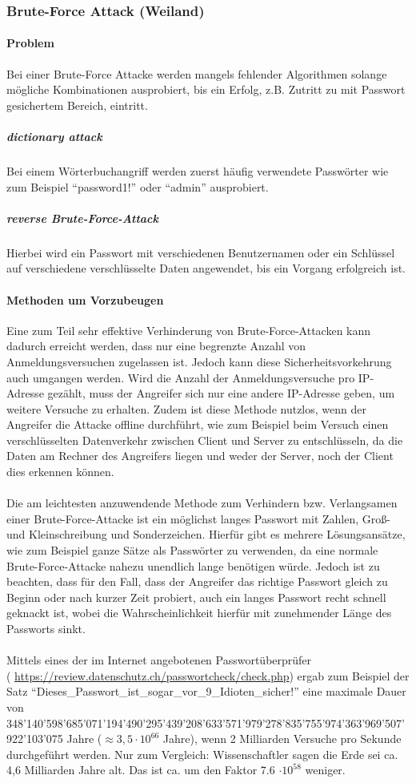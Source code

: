 \subsubsection{Brute-Force Attack (Weiland)}
\paragraph{Problem}
Bei einer Brute-Force Attacke werden mangels fehlender Algorithmen solange mögliche Kombinationen ausprobiert, bis ein Erfolg, z.B. Zutritt zu mit Passwort gesichertem Bereich, eintritt.
\subparagraph{dictionary attack}
Bei einem Wörterbuchangriff werden zuerst häufig verwendete Passwörter wie zum Beispiel \enquote{password1!} oder \enquote{admin} ausprobiert. 
\subparagraph{reverse Brute-Force-Attack}
Hierbei wird ein Passwort mit verschiedenen Benutzernamen oder ein Schlüssel auf verschiedene verschlüsselte Daten angewendet, bis ein Vorgang erfolgreich ist.
\paragraph{Methoden um Vorzubeugen}
Eine zum Teil sehr effektive Verhinderung von Brute-Force-Attacken kann dadurch erreicht werden, dass nur eine begrenzte Anzahl von Anmeldungsversuchen  zugelassen ist. Jedoch kann diese Sicherheitsvorkehrung auch umgangen werden. Wird die Anzahl der Anmeldungsversuche pro IP-Adresse gezählt, muss der Angreifer sich nur eine andere IP-Adresse geben, um weitere Versuche zu erhalten. Zudem ist diese Methode nutzlos, wenn der Angreifer die Attacke offline durchführt, wie zum Beispiel beim Versuch einen verschlüsselten Datenverkehr zwischen Client und Server zu entschlüsseln, da die Daten am Rechner des Angreifers liegen und weder der Server, noch der Client dies erkennen können. \\\\
Die am leichtesten anzuwendende Methode zum Verhindern bzw. Verlangsamen einer Brute-Force-Attacke ist ein möglichst langes Passwort mit Zahlen, Groß- und Kleinschreibung und Sonderzeichen. Hierfür gibt es mehrere Lösungsansätze, wie zum Beispiel ganze Sätze als Passwörter zu verwenden, da eine normale Brute-Force-Attacke nahezu unendlich lange benötigen würde. Jedoch ist zu beachten, dass für den Fall, dass der Angreifer das richtige Passwort gleich zu Beginn oder nach kurzer Zeit probiert, auch ein langes Passwort recht schnell geknackt ist, wobei die Wahrscheinlichkeit hierfür mit zunehmender Länge des Passworts sinkt.\\
\\
Mittels eines der im Internet angebotenen Passwortüberprüfer \\( \href{https://review.datenschutz.ch/passwortcheck/check.php}{https://review.datenschutz.ch/passwortcheck/check.php}) ergab zum Beispiel der Satz \enquote{Dieses\_Passwort\_ist\_sogar\_vor\_9\_Idioten\_sicher!} eine maximale Dauer von\\ 348'140'598'685'071'194'490'295'439'208'633'571'979'278'835'755'974'363'969'507'922'103'075 Jahre ($\approx 3,5 \cdot 10^{66}$ Jahre), wenn 2 Milliarden Versuche pro Sekunde durchgeführt werden. Nur zum Vergleich: Wissenschaftler sagen die Erde sei ca. 4,6 Milliarden Jahre alt. Das ist ca. um den Faktor 7.6 $\cdot 10^{58}$ weniger.
